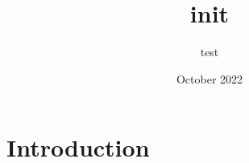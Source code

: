 \documentclass{article}
\title{init}
\author{test}
\date{October 2022}
\begin{document}
\maketitle

\section{Introduction}
\end{document}
